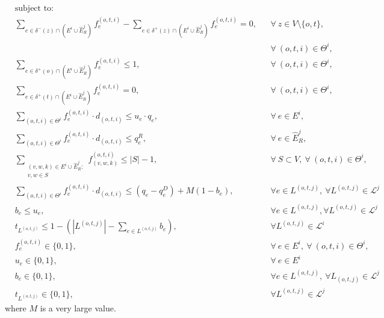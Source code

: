 \documentclass[review]{elsarticle}
\begin{document}
    \begin{align}
        & \text{subject to:}       && \nonumber\\
& \sum_{e \in \delta^-(z)\cap (E^i\cup \widehat{E}_R^j)} f_e^{(o,t,i)}-\sum_{e \in \delta^+(z)\cap (E^i\cup \widehat{E}_R^j)} f_{e}^{(o,t,i)}  = 0,                                   && \forall\ z\in V\setminus\{o,t\},\nonumber\\[-1em]
& && \forall\ (o,t,i)\in\Theta^i,  \label{eq:IterativeB}\\[1em]
& \sum_{e \in \delta^+(o)\cap (E^i\cup \widehat{E}_R^j)} f_e^{(o,t,i)}  \leq 1, && \forall\ (o,t,i)\in \Theta^i, \label{eq:IterativeC} \\
& \sum_{e \in \delta^+(t)\cap (E^i\cup \widehat{E}_R^j)} f_e^{(o,t,i)}  = 0,  && \forall\ (o,t,i)\in \Theta^i, \label{eq:IterativeD} \\
& \sum_{(o,t,i) \in \Theta^i} f_e^{(o,t,i)}\cdot d_{(o,t,i)} \leq u_e\cdot q_e, && \forall\ e \in E^i, \label{eq:IterativeE}  \\
& \sum_{(o,t,i) \in \Theta^i} f_e^{(o,t,i)}\cdot d_{(o,t,i)} \leq  q_e^R, && \forall\ e \in \widehat{E}_R^j,\label{eq:IterativeF}  \\
& \sum_{\substack{(v,w,k) \in E^i\cup \widehat{E}_R^j\colon \\ v,w \in S}}  f_{(v,w,k)}^{(o,t,i)}  \leq |S| -1, && \forall\ S \subset V,\ \forall\ (o,t,i) \in \Theta^i, \label{eq:IterativeG}\\
&\sum_{(o,t,i)\in \Theta^i} f_e^{(o,t,i)}\cdot d_{(o,t,i)} \leq (q_e - q_e^D) +M(1-b_e),\quad && \forall e \in L^{(o,t,j)},\ \forall L^{(o,t,j)} \in \mathcal{L}^j \label{eq:IterativeH}\\
&b_e \leq u_e, && \forall e\in L^{(o,t,j)}, \forall L^{(o,t,j)} \in \mathcal{L}^j \label{eq:IterativeI}\\
& t_{L^{(o,t,j)}} \leq 1 -  (|L^{(o,t,j)}|-\sum_{e \in L^{(o,t,j)}} b_e), && \forall L^{(o,t,j)} \in \mathcal{L}^i \label{eq:IterativeJ}\\
& f_e^{(o,t,i)}  \in \{0,1\}, && \forall\ e \in E^i,\ \forall\ (o,t,i) \in \Theta^i, \label{eq:IterativeK} \\
&  u_e   \in \{0,1\},   && \forall\ e \in E^i  \label{eq:IterativeL}\\
& b_e \in \{0,1\}, && \forall e \in L^{(o,t,j)},\ \forall L_{(o,t,j)}\in \mathcal{L}^j\label{eq:IterativeM}\\
& t_{L^{(o,t,j)}} \in \{0,1\}, && \forall L^{(o,t,j)} \in \mathcal{L}^j \label{eq:IterativeN}
    \end{align}
where $M$ is a very large value.
\end{document}
